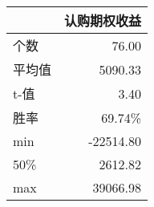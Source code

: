 \begin{tabular}{lr}
\toprule
{} &    认购期权收益 \\
\midrule
个数 &     76.00 \\
平均值  &   5090.33 \\
t-值   & 3.40 \\
胜率 & 69.74\%\\
min   & -22514.80 \\
50\%   &   2612.82 \\ 
max   &  39066.98 \\
\bottomrule
\end{tabular}
